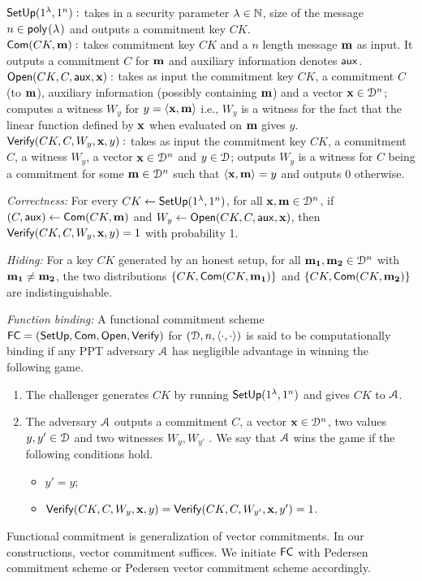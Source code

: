 \noindent$\mathsf{SetUp}(1^{\lambda}, 1^n):$ takes in a security parameter ${\lambda} \in \mathbb{N}$, size of the message $n \in \poly$ and outputs a commitment key $CK$.\\
\noindent$\mathsf{Com}(CK, {\bf m}):$ takes commitment key $CK$ and a $n$ length message ${\bf m}$ as input. It outputs a commitment $C$ for ${\bf m}$ and auxiliary information denotes $\mathsf{aux}$.\\
\noindent$\mathsf{Open}(CK, C, \mathsf{aux}, {\bf x}):$ takes as input the commitment key $CK$, a commitment $C$ (to ${\bf m}$), auxiliary information (possibly containing ${\bf m}$) and a vector ${\bf x} \in \mathcal{D}^n$; computes a witness
$W_y$ for $y = \langle {\bf x},{\bf m}\rangle$ i.e., $W_y$ is a witness for the fact that the linear function defined by ${\bf x}$ when evaluated on ${\bf m}$ gives $y$.\\
\noindent$\mathsf{Verify}(CK, C, W_y, {\bf x}, y):$ takes as input the commitment key $CK$, a commitment $C$, a witness $W_y$, a vector ${\bf x} \in \mathcal{D}^n$ and $y \in \mathcal{D}$; outputs $W_y$ is a witness for $C$ being a
commitment for some ${\bf m} \in \mathcal{D}^n$ such that $\langle {\bf x},{\bf m}\rangle = y$ and outputs $0$ otherwise.

{\it Correctness: } For every $CK \leftarrow \mathsf{SetUp}(1^{\lambda}, 1^n)$, for all ${\bf x, m} \in \mathcal{D}^n$, if $(C, \mathsf{aux}) \leftarrow \mathsf{Com}(CK, {\bf m})$ and $W_y \leftarrow \mathsf{Open}(CK, C, \mathsf{aux}, {\bf x})$, then $\mathsf{Verify}(CK, C, W_y, {\bf x}, y) = 1$ with probability 1.


{\it Hiding: } For a key $CK$ generated by an honest setup, for all ${\bf m_1, m_2} \in \mathcal{D}^n$ with ${\bf m_1} \neq {\bf m_2}$, the two distributions $\{CK, \mathsf{Com}(CK, {\bf m_1})\}$ and $\{CK, \mathsf{Com}(CK, {\bf m_2})\}$ are indistinguishable.

{\it Function binding: } A functional commitment scheme $\mathsf{FC} = (\mathsf{SetUp}, \mathsf{Com}, \mathsf{Open}, \mathsf{Verify})$ for $(\mathcal{D}, n,\langle \cdot,\cdot\rangle)$ is said to be computationally binding if any PPT adversary $\mathcal{A}$ has negligible advantage in winning the following game.
\begin{enumerate}
	\item The challenger generates $CK$ by running $\mathsf{SetUp}(1^{\lambda}, 1^n)$ and gives $CK$ to $\mathcal{A}$.
	\item The adversary $\mathcal{A}$ outputs a commitment $C$, a vector ${\bf x} \in \mathcal{D}^n$, two values $y, y' \in \mathcal{D}$ and two witnesses $W_y, W_{y'}$ . We say that $\mathcal{A}$ wins the game if the following conditions hold.
	\begin{itemize}
		\item $y' = y$;
		\item $\mathsf{Verify}(CK, C, W_y, {\bf x}, y) = \mathsf{Verify}(CK, C, W_{y'} , {\bf x}, y') = 1$.
	\end{itemize}
\end{enumerate}
Functional commitment is generalization of vector commitments. In our constructions, vector commitment suffices. We initiate $\mathsf{FC}$ with Pedersen commitment scheme or Pedersen vector commitment scheme accordingly.

